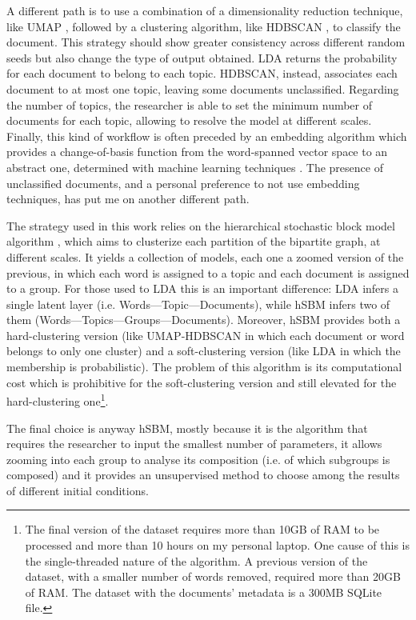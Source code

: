 \documentclass[a4paper, 11pt, headings=standardclasses, tablecaptionsbelow]{scrartcl}
\begin{document}
A different path is to use a combination of a dimensionality reduction technique, like UMAP \parencite{mcinnes2020}, followed by a clustering algorithm, like HDBSCAN \parencite{campello2013,mcinnes2017}, to classify the document. This strategy should show greater consistency across different random seeds but also change the type of output obtained. LDA returns the probability for each document to belong to each topic. HDBSCAN, instead, associates each document to at most one topic, leaving some documents unclassified. Regarding the number of topics, the researcher is able to set the minimum number of documents for each topic, allowing to resolve the model at different scales. Finally, this kind of workflow is often preceded by an embedding algorithm which provides a change-of-basis function from the word-spanned vector space to an abstract one, determined with machine learning techniques \parencite{angelov2020,grootendorst2022}.
The presence of unclassified documents, and a personal preference to not use embedding techniques, has put me on another different path.

The strategy used in this work relies on the hierarchical stochastic block model algorithm \parencite[hSBM,][]{peixoto2019,gerlach2018}, which aims to clusterize each partition of the bipartite graph, at different scales. It yields a collection of models, each one a zoomed version of the previous, in which each word is assigned to a topic and each document is assigned to a group. For those used to LDA this is an important difference: LDA infers a single latent layer (i.e. Words---Topic---Documents), while hSBM infers two of them (Words---Topics---Groups---Documents). Moreover, hSBM provides both a hard-clustering version (like UMAP-HDBSCAN in which each document or word belongs to only one cluster) and a soft-clustering version (like LDA in which the membership is probabilistic). The problem of this algorithm is its computational cost which is prohibitive for the soft-clustering version and still elevated for the hard-clustering one\footnote{The final version of the dataset requires more than 10GB of RAM to be processed and more than 10 hours on my personal laptop. One cause of this is the single-threaded nature of the algorithm. A previous version of the dataset, with a smaller number of words removed, required more than 20GB of RAM. The dataset with the documents' metadata is a 300MB SQLite file.}.

The final choice is anyway hSBM, mostly because it is the algorithm that requires the researcher to input the smallest number of parameters, it allows zooming into each group to analyse its composition (i.e. of which subgroups is composed) and it provides an unsupervised method to choose among the results of different initial conditions.
\end{document}
